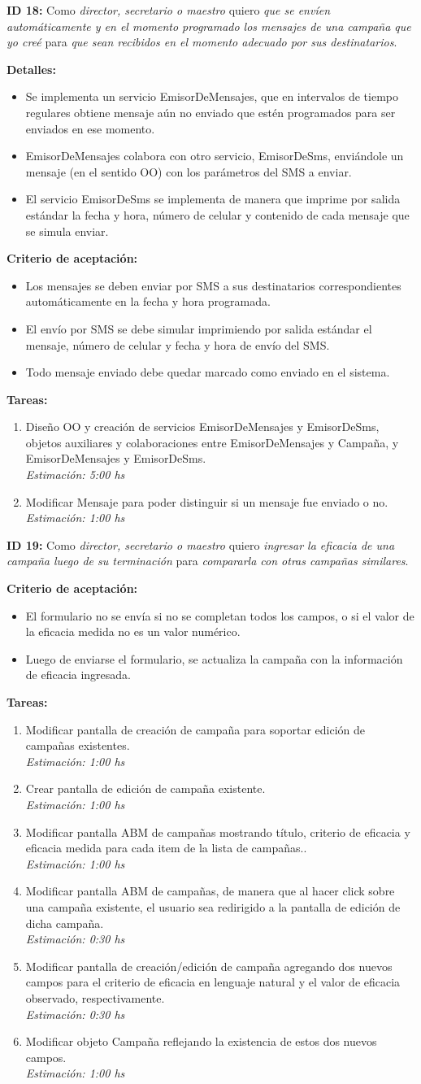 \documentclass[a4paper, 10pt, twoside]{article}
\newcommand{\sprintstory}[4]{
  \noindent
  \textbf{ID #1:} Como \emph{#2} quiero \emph{#3} para \emph{#4}.
}
\newenvironment{detalles}{
  \textbf{Detalles:}
  \begin{itemize}
}{
  \end{itemize}
}
\newcommand{\detalle}[1] {
  \item #1.
}
\newenvironment{criterios}{
  \textbf{Criterio de aceptación:}
  \begin{itemize}
}{
  \end{itemize}
}
\newcommand{\criterio}[1] {
  \item #1
}
\newenvironment{tasks}{
  \textbf{Tareas:}
  \begin{enumerate}
}{
  \end{enumerate}
}
\newcommand{\task}[2] {
  \item #1.\\
  \emph{Estimación: #2 hs}
}
\begin{document}
\sprintstory{18}
            {director, secretario o maestro}
            {que se envíen automáticamente y en el momento programado los mensajes de una campaña que yo creé}
            {que sean recibidos en el momento adecuado por sus destinatarios}

\begin{detalles}
  \detalle{Se implementa un servicio EmisorDeMensajes, que en intervalos de tiempo regulares obtiene mensaje aún no enviado que estén programados para ser enviados en ese momento}
  \detalle{EmisorDeMensajes colabora con otro servicio, EmisorDeSms, enviándole un mensaje (en el sentido OO) con los parámetros del SMS a enviar}
  \detalle{El servicio EmisorDeSms se implementa de manera que imprime por salida estándar la fecha y hora, número de celular y contenido de cada mensaje que se simula enviar}
\end{detalles}

\begin{criterios}
  \criterio{Los mensajes se deben enviar por SMS a sus destinatarios correspondientes automáticamente en la fecha y hora programada.}
  \criterio{El envío por SMS se debe simular imprimiendo por salida estándar el mensaje, número de celular y fecha y hora de envío del SMS.}
  \criterio{Todo mensaje enviado debe quedar marcado como enviado en el sistema.}
\end{criterios}

\begin{tasks}
  \task{Diseño OO y creación de servicios EmisorDeMensajes y EmisorDeSms, objetos auxiliares y colaboraciones entre EmisorDeMensajes y Campaña, y EmisorDeMensajes y EmisorDeSms}{5:00}
  \task{Modificar Mensaje para poder distinguir si un mensaje fue enviado o no}{1:00}
\end{tasks}


\sprintstory{19}
            {director, secretario o maestro}
            {ingresar la eficacia de una campaña luego de su terminación}
            {compararla con otras campañas similares}

\begin{criterios}
  \criterio{El formulario no se envía si no se completan todos los campos, o si el valor de la eficacia medida no es un valor numérico.}
  \criterio{Luego de enviarse el formulario, se actualiza la campaña con la información de eficacia ingresada.}
\end{criterios}

\begin{tasks}
  \task{Modificar pantalla de creación de campaña para soportar edición de campañas existentes}{1:00}
  \task{Crear pantalla de edición de campaña existente}{1:00}
  \task{Modificar pantalla ABM de campañas mostrando título, criterio de eficacia y eficacia medida para cada item de la lista de campañas.}{1:00}
  \task{Modificar pantalla ABM de campañas, de manera que al hacer click sobre una campaña existente, el usuario sea redirigido a la pantalla de edición de dicha campaña}{0:30}
  \task{Modificar pantalla de creación/edición de campaña agregando dos nuevos campos para el criterio de eficacia en lenguaje natural y el valor de eficacia observado, respectivamente}{0:30}
  \task{Modificar objeto Campaña reflejando la existencia de estos dos nuevos campos}{1:00}
\end{tasks}
\end{document}
